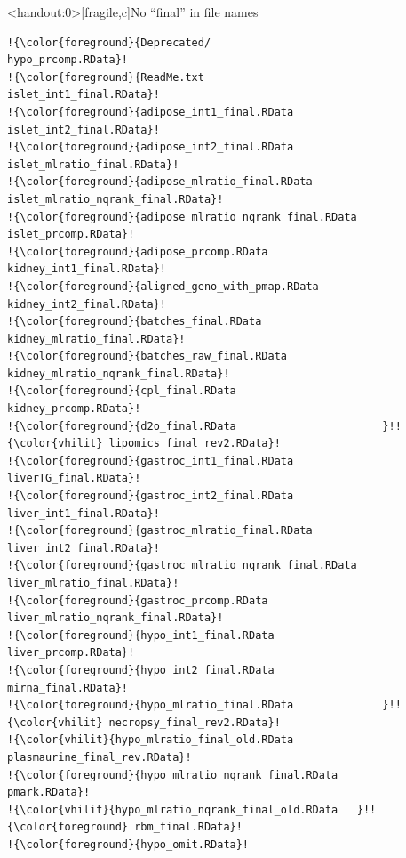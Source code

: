 \documentclass[aspectratio=169,12pt,t]{beamer}
\begin{document}
\begin{frame}<handout:0>[fragile,c]{No ``{\hilit final}'' in file names}


\addtocounter{framenumber}{-1}

\begin{center}
\begin{minipage}[c]{9.5cm}
\begin{semiverbatim}
\lstset{basicstyle=\tiny}
\begin{lstlisting}[escapechar=!,linewidth=9.5cm]
!{\color{foreground}{Deprecated/                            hypo_prcomp.RData}!
!{\color{foreground}{ReadMe.txt                             islet_int1_final.RData}!
!{\color{foreground}{adipose_int1_final.RData               islet_int2_final.RData}!
!{\color{foreground}{adipose_int2_final.RData               islet_mlratio_final.RData}!
!{\color{foreground}{adipose_mlratio_final.RData            islet_mlratio_nqrank_final.RData}!
!{\color{foreground}{adipose_mlratio_nqrank_final.RData     islet_prcomp.RData}!
!{\color{foreground}{adipose_prcomp.RData                   kidney_int1_final.RData}!
!{\color{foreground}{aligned_geno_with_pmap.RData           kidney_int2_final.RData}!
!{\color{foreground}{batches_final.RData                    kidney_mlratio_final.RData}!
!{\color{foreground}{batches_raw_final.RData                kidney_mlratio_nqrank_final.RData}!
!{\color{foreground}{cpl_final.RData                        kidney_prcomp.RData}!
!{\color{foreground}{d2o_final.RData                       }!!{\color{vhilit} lipomics_final_rev2.RData}!
!{\color{foreground}{gastroc_int1_final.RData               liverTG_final.RData}!
!{\color{foreground}{gastroc_int2_final.RData               liver_int1_final.RData}!
!{\color{foreground}{gastroc_mlratio_final.RData            liver_int2_final.RData}!
!{\color{foreground}{gastroc_mlratio_nqrank_final.RData     liver_mlratio_final.RData}!
!{\color{foreground}{gastroc_prcomp.RData                   liver_mlratio_nqrank_final.RData}!
!{\color{foreground}{hypo_int1_final.RData                  liver_prcomp.RData}!
!{\color{foreground}{hypo_int2_final.RData                  mirna_final.RData}!
!{\color{foreground}{hypo_mlratio_final.RData              }!!{\color{vhilit} necropsy_final_rev2.RData}!
!{\color{vhilit}{hypo_mlratio_final_old.RData           plasmaurine_final_rev.RData}!
!{\color{foreground}{hypo_mlratio_nqrank_final.RData        pmark.RData}!
!{\color{vhilit}{hypo_mlratio_nqrank_final_old.RData   }!!{\color{foreground} rbm_final.RData}!
!{\color{foreground}{hypo_omit.RData}!
\end{lstlisting}
\end{semiverbatim}
\end{minipage}
\end{center}


\end{frame}
\end{document}
